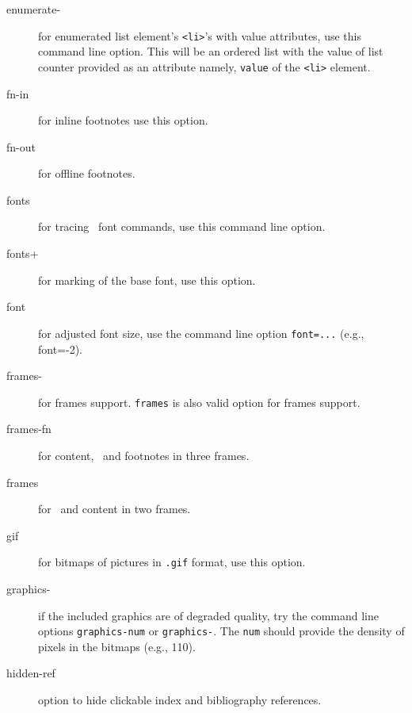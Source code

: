 \begin{description}
\item[enumerate-] for enumerated list element's \verb=<li>='s with
  value attributes, use this command line option. This will be an
  ordered list with the value of list counter provided as an attribute
  namely, \verb=value= of the \verb=<li>= element.


\item[fn-in] for inline footnotes use this option.

\item[fn-out] for offline footnotes.

\item[fonts] for tracing \latex\ font commands, use this command line
  option.

\item[fonts+] for marking of the base font, use this option.

\item[font] for adjusted font size, use the command line option
  \verb+font=...+ (e.g., font=-2).

\item[frames-] for frames support. \verb=frames= is also valid option
  for frames support.

\item[frames-fn] for content, \ and footnotes in
  three frames.

\item[frames] for \ and content in two frames.


\item[gif] for bitmaps of pictures in \verb=.gif= format, use this
  option.

\item[graphics-] if the included graphics are of degraded quality, try
  the command line options \verb=graphics-num= or \verb=graphics-=.
  The \verb=num= should provide the density of pixels in the bitmaps
  (e.g., 110).


\item[hidden-ref] option to hide clickable index and bibliography
  references.



\end{description}
